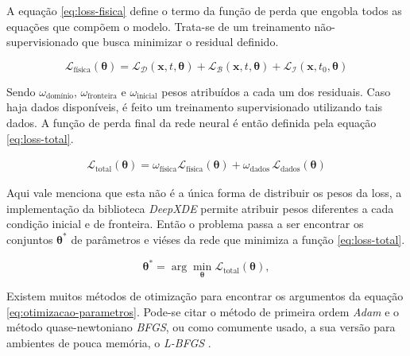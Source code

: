 A equação \ref{eq:loss-fisica} define o termo da função de perda que engobla
todos as equações que compõem o modelo. Trata-se de um treinamento 
não-supervisionado que busca minimizar o residual definido.

\begin{equation}\label{eq:loss-fisica}
    \mathcal{L}_{\text{física}}(\boldsymbol{\theta}) 
    = \mathcal{L}_{\mathcal{D}}(\boldsymbol{x},t,\boldsymbol{\theta}) 
    + \mathcal{L}_{\mathcal{B}}(\boldsymbol{x},t,\boldsymbol{\theta}) 
    + \mathcal{L}_{\mathcal{I}}(\boldsymbol{x},t_0,\boldsymbol{\theta}) 
\end{equation}

Sendo $\omega_{\text{domínio}}$, $\omega_{\text{fronteira}}$ 
e $\omega_{\text{inicial}}$ pesos atribuídos a cada um dos residuais.
Caso haja dados disponíveis, é feito um treinamento supervisionado utilizando 
tais dados. A função de perda final da rede neural é então definida pela equação
\ref{eq:loss-total}.

\begin{eqnarray}\label{eq:loss-total} 
    \mathcal{L}_{\text{total}}(\boldsymbol{\theta}) 
    = \omega_{\text{física}} \mathcal{L}_{\text{física}}(\boldsymbol{\theta}) 
    + \omega_{\text{dados}} \,\mathcal{L}_{\text{dados}}(\boldsymbol{\theta})
\end{eqnarray}

Aqui vale menciona que esta não é a única forma de distribuir os pesos da loss,
a implementação da biblioteca \textit{DeepXDE} \cite{lu-etal:21-deepxde}
permite atribuir pesos diferentes a cada condição inicial e de fronteira. 
Então o problema passa a ser encontrar os conjuntos $\boldsymbol{\theta}^*$ de 
parâmetros e viéses da rede que minimiza a função \ref{eq:loss-total}.

\begin{equation}\label{eq:otimizacao-parametros}
   \boldsymbol{\theta}^* 
   = \arg \min_{\boldsymbol{\theta}} \mathcal{L}_{\text{total}}(\boldsymbol{\theta}), 
\end{equation}

Existem muitos métodos de otimização para encontrar os argumentos 
da equação \ref{eq:otimizacao-parametros}. Pode-se citar o método de 
primeira ordem \textit{Adam} \cite{kingma-ba:14-adam} e o método quase-newtoniano
\textit{BFGS}, ou como comumente usado, a sua versão para ambientes de pouca
memória, o \textit{L-BFGS} \cite{liu-nocedal:89-lbfgs}.

